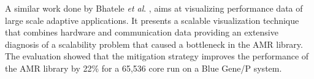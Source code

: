 A similar work done by Bhatele \textit{et al}. \cite{DBLP:conf/sc/BhateleGIGSBH12}, aims at visualizing performance data of large scale adaptive applications. It presents a scalable visualization technique that combines hardware and communication data providing an extensive diagnosis of a scalability problem that caused a bottleneck in the AMR library. The evaluation showed that the mitigation strategy improves the performance of the AMR library by 22\% for a 65,536 core run on a Blue Gene/P system. 
